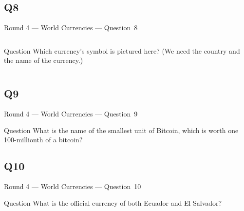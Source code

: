 \documentclass[11pt]{beamer}
\begin{document}
\subsection*{Q8}
\begin{frame}[t]{Round 4 --- World Currencies --- \mbox{Question 8}}
\vspace{-0.5em}
\begin{columns}[T,totalwidth=\linewidth]
\begin{column}{0.32\linewidth}
\begin{block}{Question}
Which currency's symbol is pictured here? (We need the country and the name of the currency.)
\end{block}
\end{column}
\begin{column}{0.65\linewidth}
\begin{center}
\texttt{[image: \{Images/rupee]}.png}
\end{center}
\end{column}
\end{columns}
\end{frame}
\subsection*{Q9}
\begin{frame}[t]{Round 4 --- World Currencies --- \mbox{Question 9}}
\vspace{-0.5em}
\begin{block}{Question}
What is the name of the smallest unit of Bitcoin, which is worth one 100-millionth of a bitcoin?
\end{block}
\end{frame}
\subsection*{Q10}
\begin{frame}[t]{Round 4 --- World Currencies --- \mbox{Question 10}}
\vspace{-0.5em}
\begin{block}{Question}
What is the official currency of both Ecuador and El Salvador?
\end{block}
\end{frame}
\end{document}
